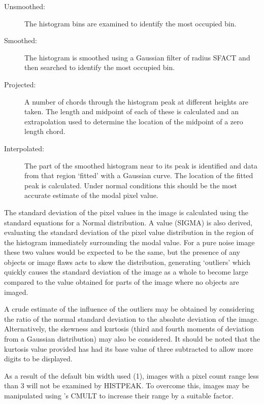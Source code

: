 \documentclass[twoside,11pt]{starlink}
\begin{document}
\begin{description}
\item[Unsmoothed:]
               The histogram bins are examined to identify the most
               occupied bin.
\item[Smoothed:]
               The histogram is smoothed using a Gaussian filter of radius
               SFACT and then searched to identify the most occupied bin.
\item[Projected:]
               A number of chords through the histogram peak at different
               heights are taken. The length and midpoint of each of these is
               calculated and an extrapolation used to determine the
               location of the midpoint of a zero length chord.
\item[Interpolated:]
               The part of the smoothed histogram near to its peak is
               identified and data from that region `fitted' with a
               Gaussian curve. The location of the fitted peak is
               calculated. Under normal conditions this should be
               the most accurate estimate of the modal pixel value.
\end{description}

The standard deviation of the pixel values in the image is
calculated using the standard equations for a Normal distribution.
A value (SIGMA) is also derived, evaluating the standard deviation of the
pixel value distribution in the region of the histogram immediately
surrounding the
modal value. For a pure noise image these two values would be expected
to be the same, but the presence of any objects or image flaws acts to
skew the distribution, generating `outliers' which quickly causes the
standard deviation of the image as a whole to become large compared to
the value obtained for parts of the image where no objects are imaged.

A crude estimate of the influence of the outliers may be obtained by
considering the ratio of the normal standard deviation to the absolute
deviation of the image. Alternatively, the skewness and kurtosis (third
and fourth moments of deviation from a Gaussian distribution) may also be
considered. It should be noted that the kurtosis value provided
has had its base value of three subtracted to allow more digits to be
displayed.

As a result of the default bin width used (1), images with a pixel count range
less than 3 will not be examined by HISTPEAK. To overcome this, images may be
manipulated using 's CMULT to increase their range by a suitable factor.
\end{document}
